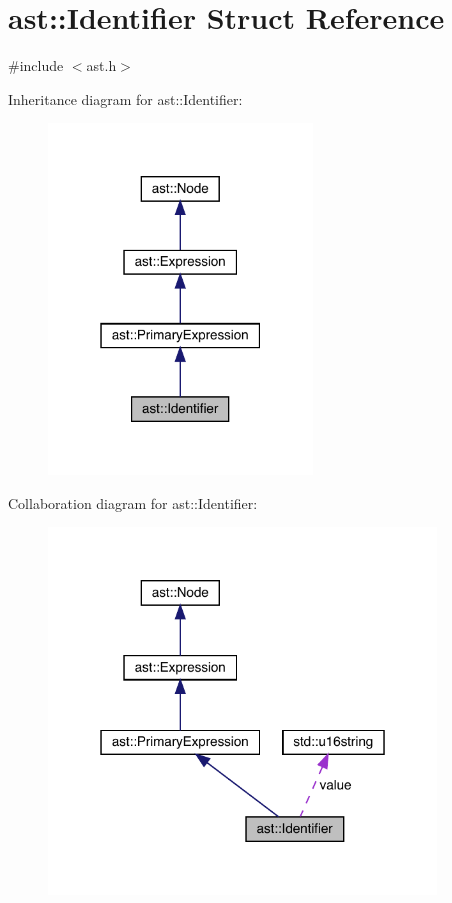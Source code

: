 \hypertarget{structast_1_1_identifier}{}\section{ast\+:\+:Identifier Struct Reference}
\label{structast_1_1_identifier}


{\ttfamily \#include $<$ast.\+h$>$}



Inheritance diagram for ast\+:\+:Identifier\+:
\nopagebreak
\begin{figure}[H]
\begin{center}
\leavevmode
\includegraphics[width=199pt]{structast_1_1_identifier__inherit__graph}
\end{center}
\end{figure}


Collaboration diagram for ast\+:\+:Identifier\+:
\nopagebreak
\begin{figure}[H]
\begin{center}
\leavevmode
\includegraphics[width=292pt]{structast_1_1_identifier__coll__graph}
\end{center}
\end{figure}
